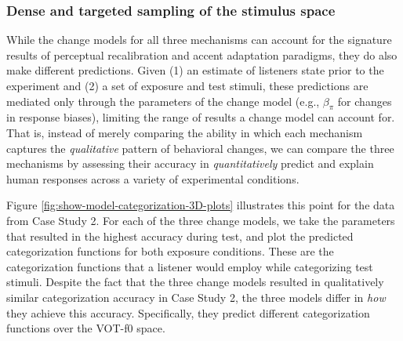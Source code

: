 \documentclass[
  11pt,
  english,
  man,floatsintext]{apa6}
\begin{document}
\hypertarget{dense-and-targeted-sampling-of-the-stimulus-space}{%
\subsubsection{Dense and targeted sampling of the stimulus space}\label{dense-and-targeted-sampling-of-the-stimulus-space}}

While the change models for all three mechanisms can account for the signature results of perceptual recalibration and accent adaptation paradigms, they do also make different predictions.
Given (1) an estimate of listeners state prior to the experiment and (2) a set of exposure and test stimuli, these predictions are mediated only through the parameters of the change model (e.g., \(\beta_{\pi}\) for changes in response biases), limiting the range of results a change model can account for. That is, instead of merely comparing the ability in which each mechanism captures the \emph{qualitative} pattern of behavioral changes, we can compare the three mechanisms by assessing their accuracy in \emph{quantitatively} predict and explain human responses across a variety of experimental conditions.

Figure \ref{fig:show-model-categorization-3D-plots} illustrates this point for the data from Case Study 2. For each of the three change models, we take the parameters that resulted in the highest accuracy during test, and plot the predicted categorization functions for both exposure conditions. These are the categorization functions that a listener would employ while categorizing test stimuli. Despite the fact that the three change models resulted in qualitatively similar categorization accuracy in Case Study 2, the three models differ in \emph{how} they achieve this accuracy. Specifically, they predict different categorization functions over the VOT-f0 space.
\end{document}
